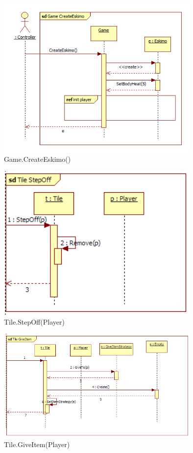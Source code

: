 \begin{figure}[H]
	\begin{center}
		\includegraphics[width=10cm]{chapters/chapter03/seqdiag/Game_CreateEskimo.png}
		\caption{Game.CreateEskimo()}
		\label{fig:GameCreateEskimo}
	\end{center}
\end{figure}
\begin{figure}[H]
	\begin{center}
		\includegraphics[width=10cm]{chapters/chapter03/seqdiag/Tile_StepOff.png}
		\caption{Tile.StepOff(Player)}
		\label{fig:TileStepOff}
	\end{center}
\end{figure}
\begin{figure}[H]
	\begin{center}
		\includegraphics[width=10cm]{chapters/chapter03/seqdiag/Tile_GiveItem.png}
		\caption{Tile.GiveItem(Player)}
		\label{fig:TileGiveItem}
	\end{center}
\end{figure}
